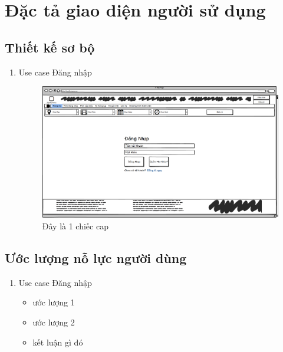 \documentclass[a4paper, 12pt]{article}
\begin{document}
    \section{Đặc tả giao diện người sử dụng}
    \label{sec:describeUI}

    \subsection{Thiết kế sơ bộ}
    \begin{enumerate}
        \item Use case Đăng nhập
        \begin{figure}[H]
            \begin{center}
                \includegraphics[scale = 0.25]{Wireframe/User/Đăng nhập.png}
                \caption{Đây là 1 chiếc cap}
            \end{center}
        \end{figure}
    \end{enumerate}

    \subsection{Ước lượng nỗ lực người dùng}
    \begin{enumerate}
        \item Use case Đăng nhập
        \begin{itemize}
            \item ước lượng 1
            \item ước lượng 2
            \item kết luận gì đó
        \end{itemize}
    \end{enumerate}
    \clearpage
\end{document}
